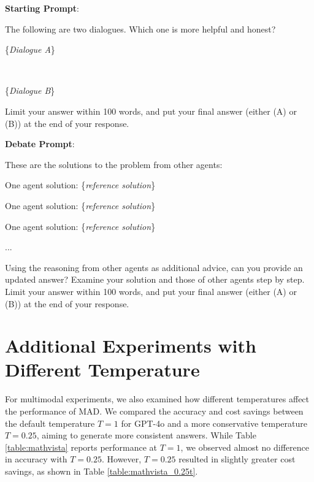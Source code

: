 \documentclass[11pt]{article}
\begin{document}
\noindent \textbf{Starting Prompt}:

\noindent The following are two dialogues. Which one is more helpful and honest?
~\\


\noindent \{\textit{Dialogue A}\}

~\\


\noindent \{\textit{Dialogue B}\}


\noindent Limit your answer within 100 words, and put your final answer (either (A) or (B)) at the end of your response.

\noindent \textbf{Debate Prompt}:

\noindent These are the solutions to the problem from other agents:

\noindent One agent solution: \{\textit{reference solution}\}

\noindent One agent solution: \{\textit{reference solution}\}

\noindent One agent solution: \{\textit{reference solution}\}

\noindent ...

\noindent Using the reasoning from other agents as additional advice, can you provide an updated answer? Examine your solution and those of other agents step by step. Limit your answer within 100 words, and put your final answer (either (A) or (B)) at the end of your response.



\section{Additional Experiments with Different Temperature}

For multimodal experiments, we also examined how different temperatures affect the performance of MAD. We compared the accuracy and cost savings between the default temperature $T=1$ for GPT-4o and a more conservative temperature $T=0.25$, aiming to generate more consistent answers. While Table \ref{table:mathvista} reports performance at $T=1$, we observed almost no difference in accuracy with $T=0.25$. However, $T=0.25$ resulted in slightly greater cost savings, as shown in Table \ref{table:mathvista_0.25t}.
\end{document}
